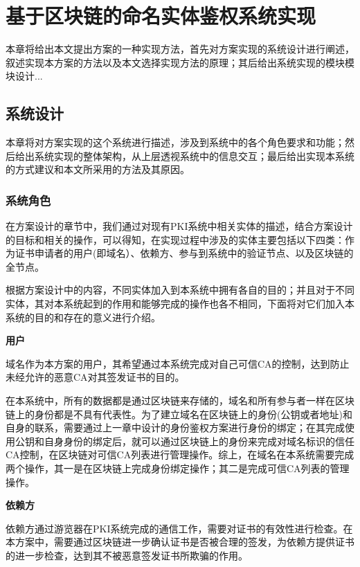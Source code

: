
\chapter{基于区块链的命名实体鉴权系统实现}

本章将给出本文提出方案的一种实现方法，首先对方案实现的系统设计进行阐述，叙述实现本方案的方法以及本文选择实现方法的原理；其后给出系统实现的模块模块设计...

\section{系统设计}

本章将对方案实现的这个系统进行描述，涉及到系统中的各个角色要求和功能；然后给出系统实现的整体架构，从上层透视系统中的信息交互；最后给出实现本系统的方式建议和本文所采用的方法及其原因。

\subsection{系统角色}


在方案设计的章节中，我们通过对现有PKI系统中相关实体的描述，结合方案设计的目标和相关的操作，可以得知，在实现过程中涉及的实体主要包括以下四类：作为证书申请者的用户(即域名）、依赖方、参与到系统中的验证节点、以及区块链的全节点。

根据方案设计中的内容，不同实体加入到本系统中拥有各自的目的；并且对于不同实体，其对本系统起到的作用和能够完成的操作也各不相同，下面将对它们加入本系统的目的和存在的意义进行介绍。

\noindent\textbf{用户}

域名作为本方案的用户，其希望通过本系统完成对自己可信CA的控制，达到防止未经允许的恶意CA对其签发证书的目的。

在本系统中，所有的数据都是通过区块链来存储的，域名和所有参与者一样在区块链上的身份都是不具有代表性。为了建立域名在区块链上的身份(公钥或者地址)和自身的联系，需要通过上一章中设计的身份鉴权方案进行身份的绑定；在其完成使用公钥和自身身份的绑定后，就可以通过区块链上的身份来完成对域名标识的信任CA控制，在区块链对可信CA列表进行管理操作。综上，在域名在本系统需要完成两个操作，其一是在区块链上完成身份绑定操作；其二是完成可信CA列表的管理操作。


\noindent\textbf{依赖方}

依赖方通过游览器在PKI系统完成的通信工作，需要对证书的有效性进行检查。在本方案中，需要通过区块链进一步确认证书是否被合理的签发，为依赖方提供证书的进一步检查，达到其不被恶意签发证书所欺骗的作用。

